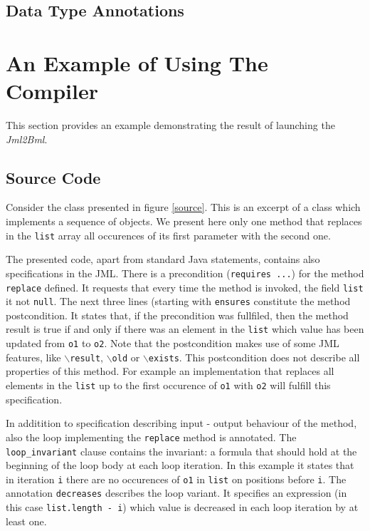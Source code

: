 \documentclass{acm_proc_article-sp}
\begin{document}
\subsection{Data Type Annotations}
\section{An Example of Using The\\Compiler}
This section provides an example demonstrating the result of launching the \textit{Jml2Bml}.
\subsection{Source Code}
Consider the class presented in figure \ref{source}. This is an excerpt of a class which implements a sequence of objects. We present here only one method that replaces in the \texttt{list} array all occurences of its first parameter with the second one.

The presented code, apart from standard Java statements, contains also specifications in the JML. There is a precondition (\texttt{requires ...}) for the method \texttt{replace} defined. It requests that every time the method is invoked, the field \texttt{list} it not \texttt{null}. The next three lines (starting with \texttt{ensures} constitute the method postcondition. It states that, if the precondition was fullfiled, then the method result is true if and only if there was an element in the \texttt{list} which value has been updated from \texttt{o1} to \texttt{o2}. Note that the postcondition makes use of some JML features, like \texttt{$\backslash$result}, \texttt{$\backslash$old} or \texttt{$\backslash$exists}. This postcondition does not describe all properties of this method. For example an implementation that replaces all elements in the \texttt{list} up to the first occurence of \texttt{o1} with \texttt{o2} will fulfill this specification.

In additition to specification describing input - output behaviour of the method, also the loop implementing the \texttt{replace} method is annotated. The \texttt{loop\_invariant} clause contains the invariant: a formula that should hold at the beginning of the loop body at each loop iteration. In this example it states that in iteration \texttt{i} there are no occurences of \texttt{o1} in \texttt{list} on positions before \texttt{i}. The annotation \texttt{decreases} describes the loop variant. It specifies an expression (in this case \texttt{list.length - i}) which value is decreased in each loop iteration by at least one.
\end{document}
